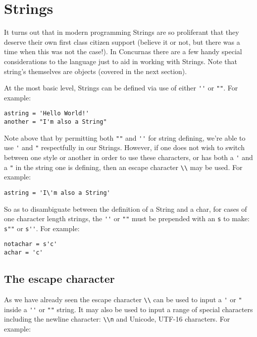 \documentclass[conc-doc]{subfiles}
\begin{document}
\section{Strings}
It turns out that in modern programming Strings are so proliferant that they deserve their own first class citizen support (believe it or not, but there was a time when this was not the case!). In Concurnas there are a few handy special considerations to the language just to aid in working with Strings. Note that string's themselves are objects (covered in the next section).

At the most basic level, Strings can be defined via use of either \lstinline{''} or \lstinline{""}. For example:
\begin{lstlisting}
astring = 'Hello World!'
another = "I'm also a String"
\end{lstlisting}

Note above that by permitting both \lstinline{""} and \lstinline{''} for string defining, we're able to use \lstinline{'} and \lstinline{"} respectfully in our Strings. However, if one does not wish to switch between one style or another in order to use these characters, or has both a \lstinline{'} and a \lstinline{"} in the string one is defining, then an escape character \lstinline{\\} may be used. For example:
\begin{lstlisting}
astring = 'I\'m also a String'
\end{lstlisting}

So as to disambiguate between the definition of a String and a char, for cases of one character length strings, the \lstinline{''} or \lstinline{""} must be prepended with an \lstinline{s} to make: \lstinline{s""} or \lstinline{s''}. For example:
\begin{lstlisting}
notachar = s'c'
achar = 'c'
\end{lstlisting}

\subsection{The escape character}
As we have already seen the escape character \lstinline{\\} can be used to input a \lstinline{'} or \lstinline{"} inside a \lstinline{''} or \lstinline{""} string. It may also be used to input a range of special characters including the newline character: \lstinline{\\n} and Unicode, UTF-16 characters. For example:
\end{document}
